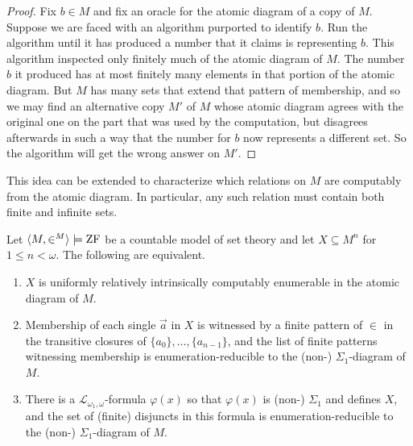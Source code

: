 \documentclass{amsart}
\newcommand{\avec}{\vec{a}}
\begin{document}
\begin{proof}
Fix $b\in M$ and fix an oracle for the atomic diagram of a copy of $M$. Suppose we are faced with an algorithm purported to identify $b$. Run the algorithm until it has produced a number that it claims is representing $b$. This algorithm inspected only finitely much of the atomic diagram of $M$. The number $b$ it produced has at most finitely many elements in that portion of the atomic diagram. But $M$ has many sets that extend that pattern of membership, and so we may find an alternative copy $M'$ of $M$ whose atomic diagram agrees with the original one on the part that was used by the computation, but disagrees afterwards in such a way that the number for $b$ now represents a different set. So the algorithm will get the wrong answer on $M'$.
\end{proof}

This idea can be extended to characterize which relations on $M$ are computably from the atomic diagram. In particular, any such relation must contain both finite and infinite sets.

\begin{theorem}\label{Theorem.Sets-known-by-atomic-diagram}
Let $\<M,\in^M>\satisfies\ZF$ be a countable model of set theory and let $X \subseteq M^n$ for $1 \le n < \omega$. The following are equivalent.
\begin{enumerate}
\item $X$ is uniformly %
relatively intrinsically computably enumerable in the atomic diagram of $M$.
\item Membership of each single $\avec$ in $X$ is witnessed by a finite pattern of $\in$ in the transitive closures of $\{a_0\}, \ldots, \{a_{n-1}\}$, and the list of finite patterns witnessing membership is enumeration-reducible
to the (non-\Levy) $\Sigma_1$-diagram of $M$.
\item There is a $\mathcal{L}_{\omega_1,\omega}$-formula $\varphi(x)$ so that $\varphi(x)$ is (non-\Levy) $\Sigma_1$ and defines $X$, and the set of (finite) disjuncts in this formula is enumeration-reducible to the (non-\Levy) $\Sigma_1$-diagram of $M$.
\end{enumerate}
\end{theorem}
\end{document}
